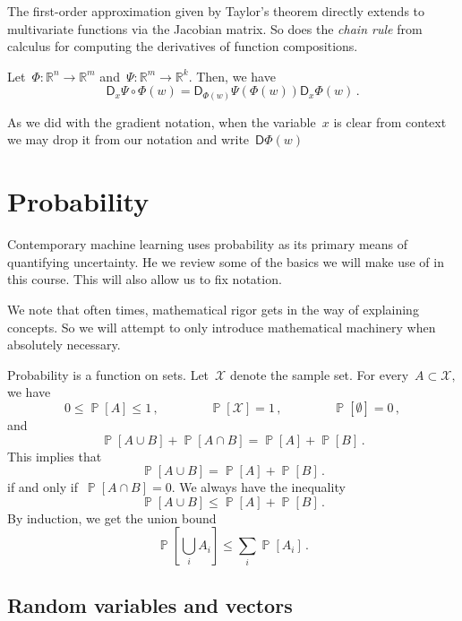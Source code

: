 \documentclass{tufte-book}
\begin{document}
The first-order approximation given by Taylor's theorem directly extends
to multivariate functions via the Jacobian matrix. So does the
\emph{chain rule} from calculus for computing the derivatives of
function compositions.

Let~\(\Phi\colon\mathbb{R}^n\to\mathbb{R}^m\)
and~\(\Psi\colon\mathbb{R}^m\to\mathbb{R}^k\). Then, we have \[
\mathsf{D}_x \Psi\circ\Phi(w)
= \mathsf{D}_{\Phi(w)}\Psi(\Phi(w))\mathsf{D}_x\Phi(w)\,.
\]

As we did with the gradient notation, when the variable~\(x\) is clear
from context we may drop it from our notation and
write~\(\mathsf{D}\Phi(w)\)

\hypertarget{probability}{%
\section{Probability}\label{probability}}

Contemporary machine learning uses probability as its primary means of
quantifying uncertainty. He we review some of the basics we will make
use of in this course. This will also allow us to fix
notation.

We note that often times, mathematical rigor gets in the way of
explaining concepts. So we will attempt to only introduce mathematical
machinery when absolutely necessary.

Probability is a function on sets. Let~\(\mathcal{X}\) denote the sample
set. For every~\(A\subset \mathcal{X},\) we have \[
  0 \leq \mathop\mathbb{P}[A] \leq 1\,, \qquad\qquad \mathop\mathbb{P}[\mathcal{X}]=1\,, \qquad \qquad \mathop\mathbb{P}[\emptyset] = 0\,,
\] and \[
\mathop\mathbb{P}[A\cup B] + \mathop\mathbb{P}[A\cap B] = \mathop\mathbb{P}[A] + \mathop\mathbb{P}[B]\,.
\] This implies that \[
  \mathop\mathbb{P}[A\cup B] = \mathop\mathbb{P}[A] + \mathop\mathbb{P}[B]\,.
\] if and only if~\(\mathop\mathbb{P}[A\cap B]=0\). We always have the
inequality \[
  \mathop\mathbb{P}[A\cup B] \leq \mathop\mathbb{P}[A] + \mathop\mathbb{P}[B]\,.
\] By induction, we get the union bound \[
  \textstyle\mathop\mathbb{P}\left[\bigcup_{i} A_i\right] \leq \sum_i \mathop\mathbb{P}[A_i]\,.
\]

\hypertarget{random-variables-and-vectors}{%
\subsection{Random variables and
vectors}\label{random-variables-and-vectors}}
\end{document}
